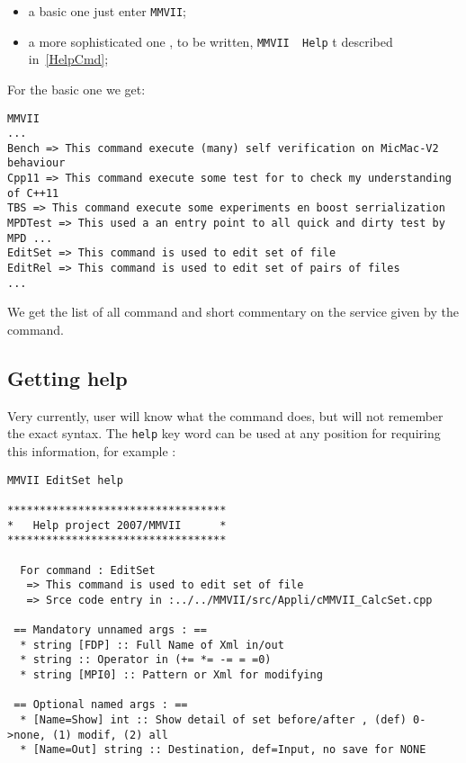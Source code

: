\documentclass[a4paper]{book}
\newcommand{\CdPPP}{{\tt MMVII}}
\begin{document}
{\begin{itemize}
   \item  a basic one just enter  {\tt  \CdPPP};
   \item  a more sophisticated one , to be written,  {\tt  \CdPPP\, Help} t
          described in~\ref{HelpCmd};
\end{itemize}

For the basic one we get:

\begin{verbatim}
MMVII
... 
Bench => This command execute (many) self verification on MicMac-V2 behaviour
Cpp11 => This command execute some test for to check my understanding of C++11
TBS => This command execute some experiments en boost serrialization
MPDTest => This used a an entry point to all quick and dirty test by MPD ...
EditSet => This command is used to edit set of file
EditRel => This command is used to edit set of pairs of files
...
\end{verbatim}

We get the list of all command and short commentary on the service given by
the command.


\subsection{Getting help}

Very currently, user will know what the command does, but will not remember the exact syntax.
The {\tt help} key word can be used at any position for requiring this information,
for example :

\begin{verbatim}
MMVII EditSet help

**********************************
*   Help project 2007/MMVII      *
**********************************

  For command : EditSet 
   => This command is used to edit set of file
   => Srce code entry in :../../MMVII/src/Appli/cMMVII_CalcSet.cpp

 == Mandatory unnamed args : ==
  * string [FDP] :: Full Name of Xml in/out
  * string :: Operator in (+= *= -= = =0)
  * string [MPI0] :: Pattern or Xml for modifying

 == Optional named args : ==
  * [Name=Show] int :: Show detail of set before/after , (def) 0->none, (1) modif, (2) all
  * [Name=Out] string :: Destination, def=Input, no save for NONE
\end{verbatim}

}
\end{document}
